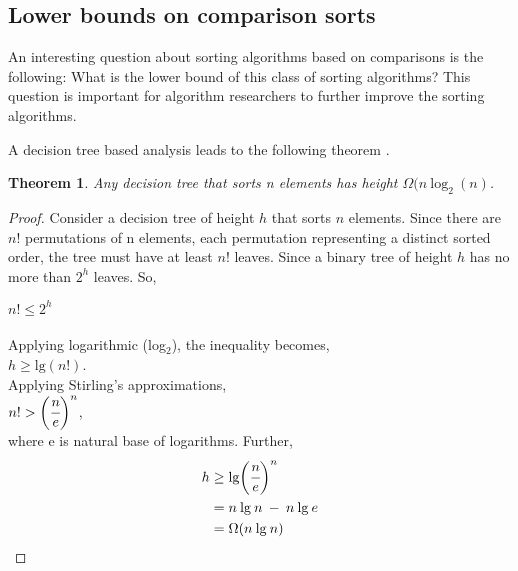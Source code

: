 \documentclass[a4paper,10pt]{article}
\newtheorem{theorem}{Theorem}
\begin{document}
\begin{multicols*}{2}
\section{Lower bounds on comparison sorts}
An interesting question about sorting algorithms based on comparisons is the following: What is the lower bound of this class of sorting algorithms? This question is important for algorithm researchers to further improve the sorting algorithms.
\par
    A decision tree based analysis leads to the following theorem \cite{clrs}.
    \begin{theorem}
        Any decision tree that sorts n elements has height $\Omega (n\: \text{log}_2\: (n)$.
    \end{theorem}
    \begin{proof}
        Consider a decision tree of height $h$ that sorts $n$ elements. Since there are $n!$ permutations of n elements, each permutation representing a distinct sorted order, the tree must have at least $n!$ leaves. Since a binary tree of height $h$ has no more than $2^h$ leaves. So,
        \par
        \vspace{0.2cm}
        $n! \leq 2^h$
        \\
        \\
        Applying logarithmic (log${}_2$), the inequality becomes,
        \vspace{0.2cm}
        \\
        $h \geq \text{lg}(n!)$.
        \vspace{0.2cm}
        \\
        Applying Stirling's approximations,
        \vspace{0.2cm}
        \\
        $n! > \bigg( \cfrac{n}{e}\bigg)^n$,
        \vspace{0.2cm}
        \\
        where e is natural base of logarithms. Further,
        \begin{align*}
            h &\geq \text{lg} \bigg( \cfrac{n}{e}\bigg)^n \\
            &= n\: \text{lg}\: n\: -\: n\: \text{lg}\: e\\
            &= \Omega(n\: \text{lg}\: n)
        \end{align*}
    \end{proof}

\end{multicols*}
\end{document}
